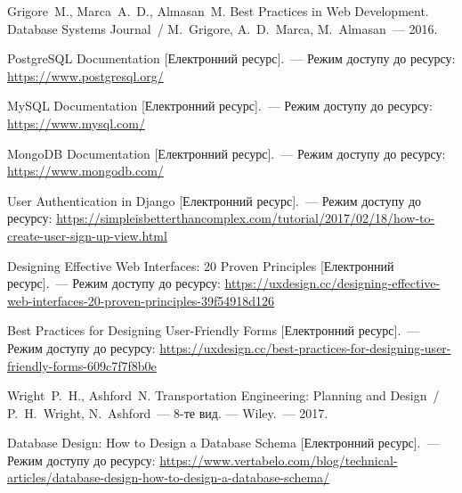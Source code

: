 \begin{thebibliography}
	 Grigore~M., Marca~A.~D., Almasan~M.  Best Practices in Web Development. Database Systems Journal~/ M.~Grigore, A.~D.~Marca, M.~Almasan~--- 2016.

	 PostgreSQL Documentation [Електронний ресурс].~--- Режим доступу до ресурсу:
	\url{https://www.postgresql.org/}
	
	 MySQL Documentation [Електронний ресурс].~--- Режим доступу до ресурсу:
	\url{https://www.mysql.com/}

	 MongoDB Documentation [Електронний ресурс].~--- Режим доступу до ресурсу:
	\url{https://www.mongodb.com/}

	 User Authentication in Django [Електронний ресурс].~--- Режим доступу до ресурсу:
	\url{https://simpleisbetterthancomplex.com/tutorial/2017/02/18/how-to-create-user-sign-up-view.html}

	 Designing Effective Web Interfaces: 20 Proven Principles [Електронний ресурс].~--- Режим доступу до ресурсу:
	\url{https://uxdesign.cc/designing-effective-web-interfaces-20-proven-principles-39f54918d126}

	 Best Practices for Designing User-Friendly Forms [Електронний ресурс].~--- Режим доступу до ресурсу:
	\url{https://uxdesign.cc/best-practices-for-designing-user-friendly-forms-609c7f7f8b0e}

	 Wright~P.~H., Ashford~N.  Transportation Engineering: Planning and Design~/ P.~H.~Wright, N.~Ashford~--- 8-те вид. --- Wiley.~--- 2017.

	 Database Design: How to Design a Database Schema [Електронний ресурс].~--- Режим доступу до ресурсу:
	\url{https://www.vertabelo.com/blog/technical-articles/database-design-how-to-design-a-database-schema/}


\end{thebibliography}
